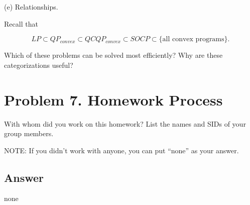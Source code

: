 \documentclass[
	12pt,
]{fphw}
\begin{document}
\vspace{30pt}
(e) Relationships.

Recall that

\[
LP \subset QP_{convex} \subset QCQP_{convex} \subset SOCP \subset \{\text{all convex programs}\}.
\]

Which of these problems can be solved most efficiently? Why are these categorizations useful?



\section*{Problem 7. Homework Process}

With whom did you work on this homework? List the names and SIDs of your group members.

NOTE: If you didn’t work with anyone, you can put “none” as your answer.

\subsection*{Answer}
none



\end{document}
